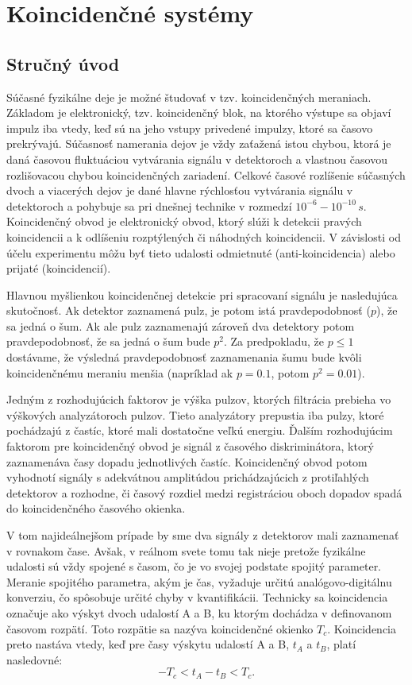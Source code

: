 \documentclass[../../main.tex]{subfiles}
\begin{document}
\chapter{Koincidenčné systémy}

\section{Stručný úvod}
Súčasné fyzikálne deje je možné študovať v tzv. koincidenčných meraniach. Základom je elektronický, tzv. koincidenčný blok, na ktorého výstupe sa objaví impulz iba vtedy, keď sú na jeho vstupy privedené impulzy, ktoré sa časovo prekrývajú. Súčasnosť namerania dejov je vždy zaťažená istou chybou, ktorá je daná časovou fluktuáciou vytvárania signálu v detektoroch a vlastnou časovou rozlišovacou chybou koincidenčných zariadení. Celkové časové rozlíšenie súčasných dvoch a viacerých dejov je dané hlavne rýchlosťou vytvárania signálu v detektoroch a pohybuje sa pri dnešnej technike v rozmedzí $10^{-6} - 10^{-10}\,s$. Koincidenčný obvod je elektronický obvod, ktorý slúži k detekcii pravých koincidencii a k odlíšeniu rozptýlených či náhodných koincidencii. V závislosti od účelu experimentu môžu byť tieto udalosti odmietnuté (anti-koincidencia) alebo prijaté (koincidencií).

Hlavnou myšlienkou koincidenčnej detekcie pri spracovaní signálu je nasledujúca skutočnosť. Ak detektor zaznamená pulz, je potom istá pravdepodobnosť ($p$), že sa jedná o šum. Ak ale pulz zaznamenajú zároveň dva detektory potom pravdepodobnosť, že sa jedná o šum bude $p^2$. Za predpokladu, že $p \leq 1$ dostávame, že výsledná pravdepodobnosť zaznamenania šumu bude kvôli koincidenčnému meraniu menšia (napríklad ak $p=0.1$, potom $p^2=0.01$).

Jedným z rozhodujúcich faktorov je výška pulzov, ktorých filtrácia prebieha vo výškových analyzátoroch pulzov. Tieto analyzátory prepustia iba pulzy, ktoré pochádzajú z častíc, ktoré mali dostatočne veľkú energiu. Ďalším rozhodujúcim faktorom pre koincidenčný obvod je signál z časového diskriminátora, ktorý zaznamenáva časy dopadu jednotlivých častíc. Koincidenčný obvod potom vyhodnotí signály s adekvátnou amplitúdou prichádzajúcich z protiľahlých detektorov a rozhodne, či časový rozdiel medzi registráciou oboch dopadov spadá do koincidenčného časového okienka. 

V tom najideálnejšom prípade by sme dva signály z detektorov mali zaznamenať v rovnakom čase. Avšak, v reálnom svete tomu tak nieje pretože fyzikálne udalosti sú vždy spojené s časom, čo je vo svojej podstate spojitý parameter. Meranie spojitého parametra, akým je čas, vyžaduje určitú analógovo-digitálnu konverziu, čo spôsobuje určité chyby v kvantifikácii. Technicky sa koincidencia označuje ako výskyt dvoch udalostí A a B, ku ktorým dochádza v definovanom časovom rozpätí. Toto rozpätie sa nazýva koincidenčné okienko $T_c$. Koincidencia preto nastáva vtedy, keď pre časy výskytu udalostí A a B, $t_A$ a $t_B$, platí nasledovné:
$$ -T_c < t_A-t_B < T_c.$$
\end{document}
